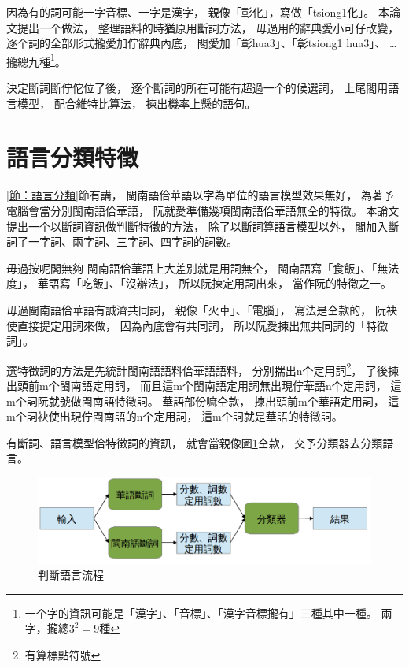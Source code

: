 因為有的詞可能一字音標、一字是漢字，
親像「彰化」，寫做「tsiong1化」。
本論文提出一个做法，
整理語料的時猶原用斷詞方法，
毋過用的辭典愛小可仔改變，
逐个詞的全部形式攏愛加佇辭典內底，
閣愛加「彰hua3」、「彰tsiong1 hua3」、
…攏總九種\footnote{一个字的資訊可能是「漢字」、「音標」、「漢字音標攏有」三種其中一種。
兩字，攏總$3^{2}=9$種}。


決定斷詞斷佇佗位了後，
逐个斷詞的所在可能有超過一个的候選詞，
上尾閣用語言模型，
配合維特比算法，
揀出機率上懸的語句。


\section{語言分類特徵}
\label{節：語言分類特徵}

\ref{節：語言分類}節有講，
閩南語佮華語以字為單位的語言模型效果無好，
為著予電腦會當分別閩南語佮華語，
阮就愛準備幾項閩南語佮華語無仝的特徵。
本論文提出一个以斷詞資訊做判斷特徵的方法，
除了以斷詞算語言模型以外，
閣加入斷詞了一字詞、兩字詞、三字詞、四字詞的詞數。

毋過按呢閣無夠
閩南語佮華語上大差別就是用詞無仝，
閩南語寫「食飯」、「無法度」，
華語寫「吃飯」、「沒辦法」，
所以阮揀定用詞出來，
當作阮的特徵之一。

毋過閩南語佮華語有誠濟共同詞，
親像「火車」、「電腦」，
寫法是仝款的，
阮袂使直接提定用詞來做，
因為內底會有共同詞，
所以阮愛揀出無共同詞的「特徵詞」。

選特徵詞的方法是先統計閩南語語料佮華語語料，
分別揣出n个定用詞\footnote{有算標點符號}，
了後揀出頭前m个閩南語定用詞，
而且這m个閩南語定用詞無出現佇華語n个定用詞，
這m个詞阮就號做閩南語特徵詞。
華語部份嘛仝款，
揀出頭前m个華語定用詞，
這m个詞袂使出現佇閩南語的n个定用詞，
這m个詞就是華語的特徵詞。

有斷詞、語言模型佮特徵詞的資訊，
就會當親像圖\ref{圖：判斷語言架構}仝款，
交予分類器去分類語言。


\begin{figure}
\centerline{\includegraphics[keepaspectratio,width=40em]{圖/判斷語言架構}}
\caption{判斷語言流程}
\label{圖：判斷語言架構}
\end{figure}

